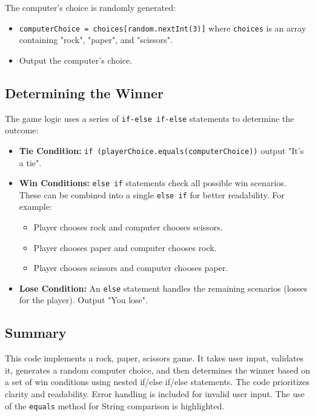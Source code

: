 \documentclass{article}
\begin{document}
The computer's choice is randomly generated:

\begin{itemize}
    \item \texttt{computerChoice = choices[random.nextInt(3)]} where \texttt{choices} is an array containing "rock", "paper", and "scissors".
    \item Output the computer's choice.
\end{itemize}


\subsection{Determining the Winner}

The game logic uses a series of \texttt{if-else if-else} statements to determine the outcome:

\begin{itemize}
    \item \textbf{Tie Condition:} \texttt{if (playerChoice.equals(computerChoice))} output "It's a tie".
    \item \textbf{Win Conditions:}  \texttt{else if} statements check all possible win scenarios.  These can be combined into a single \texttt{else if} for better readability. For example:
    \begin{itemize}
        \item Player chooses rock and computer chooses scissors.
        \item Player chooses paper and computer chooses rock.
        \item Player chooses scissors and computer chooses paper.
    \end{itemize}
    \item \textbf{Lose Condition:} An \texttt{else} statement handles the remaining scenarios (losses for the player).  Output "You lose".
\end{itemize}

\subsection{Summary}

This code implements a rock, paper, scissors game. It takes user input, validates it, generates a random computer choice, and then determines the winner based on a set of win conditions using nested if/else if/else statements.  The code prioritizes clarity and readability.  Error handling is included for invalid user input. The use of the \texttt{equals} method for String comparison is highlighted.
\end{document}
